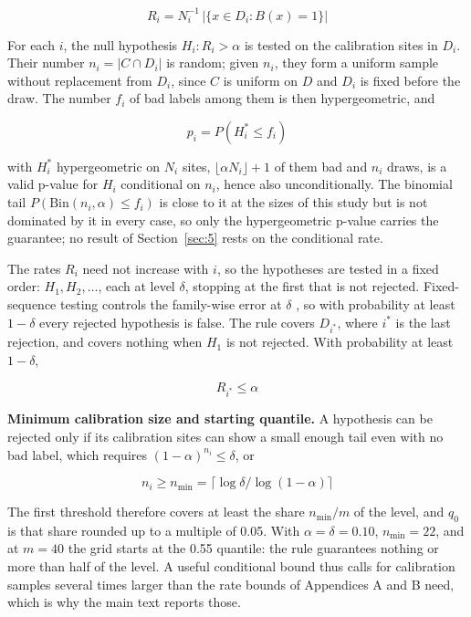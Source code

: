 \documentclass{iopjournal}
\begin{document}
\[
R_i = N_i^{-1} \, \lvert \{x \in D_i : B(x) = 1\} \rvert
\]

For each \(i\), the null hypothesis \(H_i : R_i > \alpha\) is tested on the calibration sites in \(D_i\). Their number \(n_i = |C \cap D_i|\) is random; given \(n_i\), they form a uniform sample without replacement from \(D_i\), since \(C\) is uniform on \(D\) and \(D_i\) is fixed before the draw. The number \(f_i\) of bad labels among them is then hypergeometric, and

\[
p_i = P(H_i^\ast \le f_i)
\]

with \(H_i^\ast\) hypergeometric on \(N_i\) sites, \(\lfloor \alpha N_i \rfloor + 1\) of them bad and \(n_i\) draws, is a valid p-value for \(H_i\) conditional on \(n_i\), hence also unconditionally. The binomial tail \(P(\mathrm{Bin}(n_i, \alpha) \le f_i)\) is close to it at the sizes of this study but is not dominated by it in every case, so only the hypergeometric p-value carries the guarantee; no result of Section~\ref{sec:5} rests on the conditional rate.

The rates \(R_i\) need not increase with \(i\), so the hypotheses are tested in a fixed order: \(H_1, H_2, \dots\), each at level \(\delta\), stopping at the first that is not rejected. Fixed-sequence testing controls the family-wise error at \(\delta\) \cite{WestfallKrishen2001}, so with probability at least \(1 - \delta\) every rejected hypothesis is false. The rule covers \(D_{i^\ast}\), where \(i^\ast\) is the last rejection, and covers nothing when \(H_1\) is not rejected. With probability at least \(1 - \delta\),

\[
R_{i^\ast} \le \alpha
\]

\textbf{Minimum calibration size and starting quantile.} A hypothesis can be rejected only if its calibration sites can show a small enough tail even with no bad label, which requires \((1 - \alpha)^{n_i} \le \delta\), or

\[
n_i \ge n_{\min} = \lceil \log \delta / \log (1 - \alpha) \rceil
\]

The first threshold therefore covers at least the share \(n_{\min}/m\) of the level, and \(q_0\) is that share rounded up to a multiple of 0.05. With \(\alpha = \delta = 0.10\), \(n_{\min} = 22\), and at \(m = 40\) the grid starts at the 0.55 quantile: the rule guarantees nothing or more than half of the level. A useful conditional bound thus calls for calibration samples several times larger than the rate bounds of Appendices A and B need, which is why the main text reports those.
\end{document}

